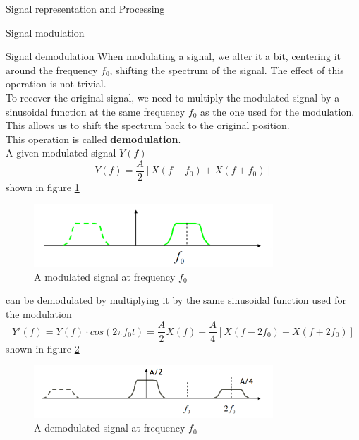 \begin{section}{Signal representation and Processing}
\begin{subsection}{Signal modulation}
    \end{subsection}
    \begin{subsection}{Signal demodulation}
      When modulating a signal, we alter it a bit, centering it around the frequency $f_0$, shifting
      the spectrum of the signal. The effect of this operation is not trivial.\\
      To recover the original signal, we need to multiply the modulated signal by a sinusoidal
      function at the same frequency $f_0$ as the one used for the modulation. This allows us to
      shift the spectrum back to the original position.\\
      This operation is called \textbf{demodulation}.\\
      A given modulated signal $Y(f)$
      \begin{equation}
        Y(f) = \frac{A}{2}[X(f-f_0) + X(f+f_0)]
      \end{equation}
      shown in figure \ref{fig:Demodulation1}
      \begin{figure}[h]
        \centering
        \includegraphics[width=0.8\textwidth]{img/wireless/demodulation1.png}
        \caption{A modulated signal at frequency $f_0$}
        \label{fig:Demodulation1}
      \end{figure}
      can be demodulated by multiplying it by the same sinusoidal function used for the modulation
      \begin{equation}
        Y'(f) = Y(f) \cdot cos(2\pi f_0 t)= \frac{A}{2}X(f)+\frac{A}{4}[X(f-2f_0)+X(f+2f_0)]
      \end{equation}
      shown in figure \ref{fig:Demodulation2}\\
      \begin{figure}[h]
        \centering
        \includegraphics[width=0.8\textwidth]{img/wireless/demodulation2.png}
        \caption{A demodulated signal at frequency $f_0$}
        \label{fig:Demodulation2}
      \end{figure}

\end{subsection}
\end{section}
